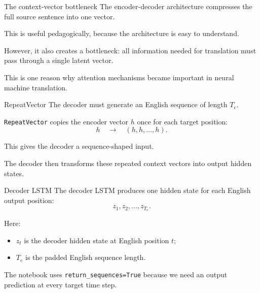 \documentclass[aspectratio=169]{beamer}
\begin{document}
%
%
\begin{frame}[fragile]{The context-vector bottleneck}
The encoder-decoder architecture compresses the full source sentence into one vector.

\vspace{0.3cm}
This is useful pedagogically, because the architecture is easy to understand.

\vspace{0.3cm}
However, it also creates a bottleneck: all information needed for translation must pass through a single latent vector.

\vspace{0.3cm}
This is one reason why attention mechanisms became important in neural machine translation.
\end{frame}
%
%
\begin{frame}[fragile]{RepeatVector}
The decoder must generate an English sequence of length $T_e$.

\vspace{0.3cm}
\texttt{RepeatVector} copies the encoder vector $h$ once for each target position:
\[
    h \quad \longrightarrow \quad (h, h, \ldots, h).
\]

\vspace{0.3cm}
This gives the decoder a sequence-shaped input.

\vspace{0.3cm}
The decoder then transforms these repeated context vectors into output hidden states.
\end{frame}
%
%
\begin{frame}[fragile]{Decoder LSTM}
The decoder LSTM produces one hidden state for each English output position:
\[
    z_1, z_2, \ldots, z_{T_e}.
\]

Here:
\begin{itemize}
    \item $z_t$ is the decoder hidden state at English position $t$;
    \item $T_e$ is the padded English sequence length.
\end{itemize}

\vspace{0.3cm}
The notebook uses \texttt{return\_sequences=True} because we need an output prediction at every target time step.
\end{frame}
\end{document}
